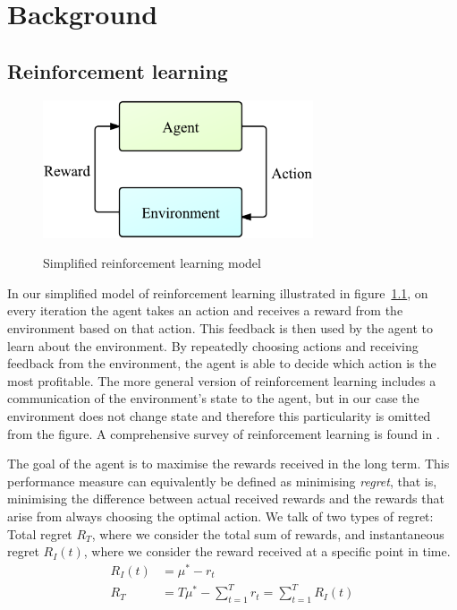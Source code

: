 \chapter{Background}
\label{ch:background}

\section{Reinforcement learning}
\begin{figure}[htbp]
    \centering
    \includegraphics[width=8cm]{images/ReinforcementLearning}
    \label{fig:rlearn}
    \caption{Simplified reinforcement learning model}
\end{figure}

In our simplified model of reinforcement learning illustrated in figure~\ref{fig:rlearn}, on every iteration the agent takes an action and receives a reward from the environment based on that action.
This feedback is then used by the agent to learn about the environment.
By repeatedly choosing actions and receiving feedback from the environment, the agent is able to decide which action is the most profitable. 
The more general version of reinforcement learning includes a communication of the environment's state to the agent, but in our case the environment does not change state and therefore this particularity is omitted from the figure.
A comprehensive survey of reinforcement learning is found in \cite{Kaelbling1996}.

The goal of the agent is to maximise the rewards received in the long term.
This performance measure can equivalently be defined as minimising \emph{regret}, that is, minimising the difference between actual received rewards and the rewards that arise from always choosing the optimal action.
We talk of two types of regret:
Total regret $R_T$, where we consider the total sum of rewards, and instantaneous regret $R_I(t)$, where we consider the reward received at a specific point in time.
\begin{align*}
    R_I(t) &= \mu^* - r_t \\
    R_T &= T\mu^* - \sum_{t=1}^{T}{r_t} = \sum_{t = 1}^{T}{R_I(t)} 
\end{align*}

